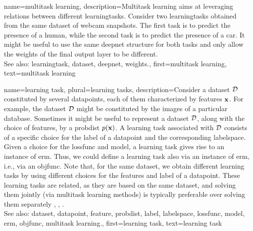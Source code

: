 {name={multitask learning},
	description={Multitask learning aims at leveraging relations between 
	 	different \glspl{learningtask}. Consider two \glspl{learningtask} obtained from the 
	 	same \gls{dataset} of webcam snapshots. The first task is to predict the presence 
	 	of a human, while the second task is to predict the presence of a car. It might be useful 
	 	to use the same \gls{deepnet} structure for both tasks and only allow the \gls{weights} of 
	 	the final output layer to be different.
	 			\\ 
		See also: \gls{learningtask}, \gls{dataset}, \gls{deepnet}, \gls{weights}.},
	first={multitask learning},
	text={multitask learning}
}

{name={learning task}, plural={learning tasks}, 
	description={Consider a \gls{dataset} $\mathcal{D}$ constituted by several \glspl{datapoint}, each of them 
	 	characterized by \glspl{feature} ${\bf x}$. For example, the \gls{dataset} $\mathcal{D}$ 
	 	might be constituted by the images of a particular database. Sometimes it might be useful 
	 	to represent a \gls{dataset} $\mathcal{D}$, along with the choice of \glspl{feature}, by a \gls{probdist} $p({\bf x})$. 
	 	A learning task associated with $\mathcal{D}$ consists of a specific 
	 	choice for the \gls{label} of a \gls{datapoint} and the corresponding \gls{labelspace}. 
	 	Given a choice for the \gls{lossfunc} and \gls{model}, a learning task gives rise to an 
	 	instance of \gls{erm}. Thus, we could define a learning task also via an instance of \gls{erm}, i.e., 
	 	via an \gls{objfunc}. Note that, for the same \gls{dataset}, we obtain different learning tasks by using 
	 	different choices for the \glspl{feature} and \gls{label} of a \gls{datapoint}. These learning 
	 	tasks are related, as they are based on the same \gls{dataset}, and solving them jointly 
	 	(via \gls{multitask learning} methods) is typically preferable over solving them separately \cite{Caruana:1997wk}, \cite{JungGaphLassoSPL}, \cite{CSGraphSelJournal}.
	 			\\ 
		See also: \gls{dataset}, \gls{datapoint}, \gls{feature}, \gls{probdist}, \gls{label}, \gls{labelspace}, \gls{lossfunc}, \gls{model}, \gls{erm}, \gls{objfunc}, \gls{multitask learning}.},
	first={learning task},
	text={learning task}
}

